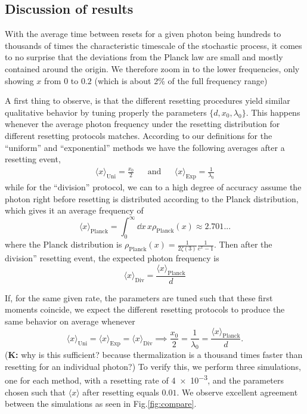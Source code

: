\documentclass[a4paper,12pt,reqno,superscriptaddress,nofootinbib]{article}
\theoremstyle{plain}
\theoremstyle{definition}
\theoremstyle{remark}
\newcommand{\0}{^{(0)}}
\newcommand{\1}{^{(1)}}
\newcommand{\2}{^{(2)}}
\begin{document}
\subsection{Discussion of results}

With the average time between resets for a given photon being hundreds to thousands of times the characteristic timescale of the stochastic process, it comes to no surprise that the deviations from the Planck law are small and mostly contained around the origin. We therefore zoom in to the lower frequencies, only showing $x$ from $0$ to $0.2$ (which is about 2\% of the full frequency range)

A first thing to observe, is that the different resetting procedures yield similar qualitative behavior by tuning properly the parameters $\{d,x_0,\lambda_0\}$.  This happens whenever the average photon frequency under the resetting distribution for different resetting protocols matches. According to our definitions for the ``uniform'' and ``exponential'' methods we have the following averages after a resetting event,
\begin{align*}\langle x \rangle_{\text{Uni}} = \frac{x_0}{2} &&\text{and}&& \langle x \rangle_\text{Exp} = \frac{1}{\lambda_0}\end{align*}
while for the ``division'' protocol, we can to a high degree of accuracy assume the photon right before resetting is distributed according to the Planck distribution, which gives it an average frequency of
\[\langle x \rangle_\text{Planck} = \int_0^{\infty}\dd x\,  x\rho_\text{Planck}(x) \approx 2.701...\]
where the Planck distribution is $\rho_\text{Planck}(x) = \frac{1}{2\zeta(3)}\frac{1}{e^{x}-1}$. Then after the division'' resetting event, the expected photon frequency is
\[\langle x\rangle_{\text{Div}}=\frac{\langle x \rangle_\text{Planck}}{d} \]

If, for the same given rate, the parameters are tuned such that these first moments coincide, we expect the different resetting protocols to produce the same behavior on average whenever
\[\langle x \rangle_\text{Uni} = \langle x \rangle_\text{Exp}=\langle x\rangle_{\text{Div}} \implies \frac{x_0}{2}=\frac{1}{\lambda_0} = \frac{\langle x \rangle_\text{Planck}}{d}.\] (\textbf{K:} why is this sufficient? because thermalization is a thousand times faster than resetting for an individual photon?)
To verify this, we perform three simulations, one for each method, with a resetting rate of \num{4e-3}, and the parameters chosen such that $\langle x \rangle$ after resetting equals $0.01$. We observe excellent agreement between the simulations as seen in Fig.\ref{fig:compare}.\\
\end{document}
